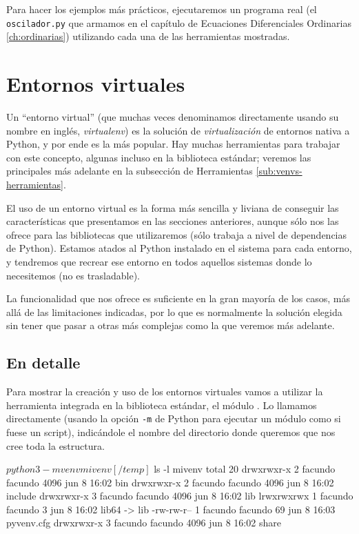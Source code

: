 Para hacer los ejemplos más prácticos, ejecutaremos un programa real (el \texttt{oscilador.py} que armamos en el capítulo de Ecuaciones Diferenciales Ordinarias \ref{ch:ordinarias}) utilizando cada una de las herramientas mostradas.


\section{Entornos virtuales} \label{sec:virtualenvs}

Un ``entorno virtual'' (que muchas veces denominamos directamente usando su nombre en inglés, \textit{virtualenv}) es la solución de \textit{virtualización} de entornos nativa a Python, y por ende es la más popular. Hay muchas herramientas para trabajar con este concepto, algunas incluso en la biblioteca estándar; veremos las principales más adelante en la subsección de Herramientas \ref{sub:venvs-herramientas}.

El uso de un entorno virtual es la forma más sencilla y liviana de conseguir las características que presentamos en las secciones anteriores, aunque sólo nos las ofrece para las bibliotecas que utilizaremos (sólo trabaja a nivel de dependencias de Python). Estamos atados al Python instalado en el sistema para cada entorno, y tendremos que recrear ese entorno en todos aquellos sistemas donde lo necesitemos (no es trasladable). 

La funcionalidad que nos ofrece es suficiente en la gran mayoría de los casos, más allá de las limitaciones indicadas, por lo que es normalmente la solución elegida sin tener que pasar a otras más complejas como la que veremos más adelante.


\subsection{En detalle}

Para mostrar la creación y uso de los entornos virtuales vamos a utilizar la herramienta integrada en la biblioteca estándar, el módulo . Lo llamamos directamente (usando la opción \verb|-m| de Python para ejecutar un módulo como si fuese un script), indicándole el nombre del directorio donde queremos que nos cree toda la estructura.

\begin{shell}
[/temp]$ python3 -m venv mivenv
[/temp]$ ls -l mivenv
total 20
drwxrwxr-x 2 facundo facundo 4096 jun  8 16:02 bin
drwxrwxr-x 2 facundo facundo 4096 jun  8 16:02 include
drwxrwxr-x 3 facundo facundo 4096 jun  8 16:02 lib
lrwxrwxrwx 1 facundo facundo    3 jun  8 16:02 lib64 -> lib
-rw-rw-r-- 1 facundo facundo   69 jun  8 16:03 pyvenv.cfg
drwxrwxr-x 3 facundo facundo 4096 jun  8 16:02 share
\end{shell}

